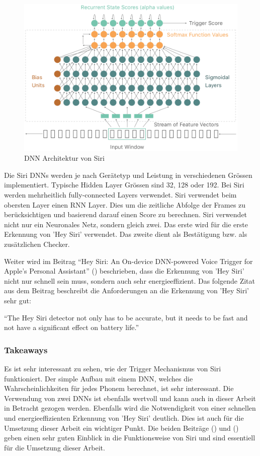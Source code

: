 \documentclass[11pt,a4paper]{article}
\begin{document}
\begin{figure}[h]
	\centering
	\includegraphics[width=0.75\linewidth]{img/siri_dnn.png}
	\caption{DNN Architektur von Siri}
	\label{fig:siri_dnn}
\end{figure}

\noindent
Die Siri DNNs werden je nach Gerätetyp und Leistung in verschiedenen Grössen implementiert.
Typische Hidden Layer Grössen sind 32, 128 oder 192. Bei Siri werden mehrheitlich fully-connected
Layers verwendet. Siri verwendet beim obersten Layer einen RNN Layer. Dies um die zeitliche
Abfolge der Frames zu berücksichtigen und basierend darauf einen Score zu berechnen. Siri verwendet
nicht nur ein Neuronales Netz, sondern gleich zwei. Das erste wird für die erste Erkennung von
'Hey Siri' verwendet. Das zweite dient als Bestätigung bzw. als zusätzlichen Checker.

\noindent \newline
Weiter wird im Beitrag ``Hey Siri: An On-device DNN-powered Voice Trigger for Apple’s Personal
Assistant'' (\cite{siri2017hey}) beschrieben, dass die Erkennung von 'Hey Siri' nicht nur schnell sein
muss, sondern auch sehr energieeffizient. Das folgende Zitat aus dem Beitrag beschreibt die
Anforderungen an die Erkennung von 'Hey Siri' sehr gut:

\begin{displayquote}
	``The Hey Siri detector not only has to be accurate, but it needs to be fast
	and not have a significant effect on battery life.''
\end{displayquote}

\subsubsection{Takeaways}
Es ist sehr interessant zu sehen, wie der Trigger Mechanismus von Siri funktioniert. Der simple
Aufbau mit einem DNN, welches die Wahrscheinlichkeiten für jedes Phonem berechnet, ist sehr
interessant. Die Verwendung von zwei DNNs ist ebenfalls wertvoll und kann auch in dieser Arbeit
in Betracht gezogen werden. Ebenfalls wird die Notwendigkeit von einer schnellen und
energieeffizienten Erkennung von 'Hey Siri' deutlich. Dies ist auch für die Umsetzung dieser Arbeit
ein wichtiger Punkt. Die beiden Beiträge (\cite{siri2017hey}) und (\cite{apple2023voice}) geben
einen sehr guten Einblick in die Funktionsweise von Siri und sind essentiell für die Umsetzung
dieser Arbeit.
\end{document}
